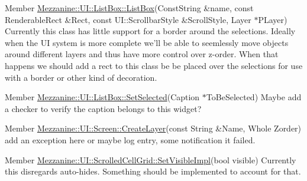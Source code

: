 \label{todo__todo000027}
\hypertarget{todo__todo000027}{}
 
\begin{DoxyDescription}
\item[Member \hyperlink{classMezzanine_1_1UI_1_1ListBox_a60130f372bc78fbb20f28270bbed8cf2}{Mezzanine::UI::ListBox::ListBox}(ConstString \&name, const RenderableRect \&Rect, const UI::ScrollbarStyle \&ScrollStyle, Layer $\ast$PLayer) ]Currently this class has little support for a border around the selections. Ideally when the UI system is more complete we'll be able to seemlessly move objects around different layers and thus have more control over z-\/order. When that happens we should add a rect to this class be be placed over the selections for use with a border or other kind of decoration. 
\end{DoxyDescription}

\label{todo__todo000028}
\hypertarget{todo__todo000028}{}
 
\begin{DoxyDescription}
\item[Member \hyperlink{classMezzanine_1_1UI_1_1ListBox_a81ddebed01b1503478c2fa7b75ce4b24}{Mezzanine::UI::ListBox::SetSelected}(Caption $\ast$ToBeSelected) ]Maybe add a checker to verify the caption belongs to this widget? 
\end{DoxyDescription}

\label{todo__todo000029}
\hypertarget{todo__todo000029}{}
 
\begin{DoxyDescription}
\item[Member \hyperlink{classMezzanine_1_1UI_1_1Screen_a4c7471ee8b43649a5eab8c43e28f31b7}{Mezzanine::UI::Screen::CreateLayer}(const String \&Name, Whole Zorder) ]add an exception here or maybe log entry, some notification it failed. 
\end{DoxyDescription}

\label{todo__todo000030}
\hypertarget{todo__todo000030}{}
 
\begin{DoxyDescription}
\item[Member \hyperlink{classMezzanine_1_1UI_1_1ScrolledCellGrid_a259a2f007e7afc5b2fa967c02b0d5627}{Mezzanine::UI::ScrolledCellGrid::SetVisibleImpl}(bool visible) ]Currently this disregards auto-\/hides. Something should be implemented to account for that. 
\end{DoxyDescription}

\label{todo__todo000033}
\hypertarget{todo__todo000033}{}
 
